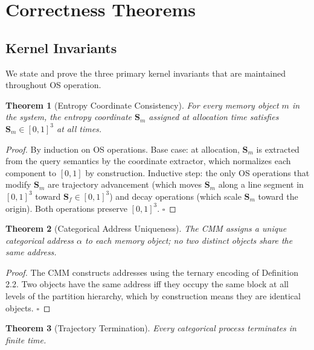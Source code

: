 \documentclass[12pt,twocolumn]{article}
\newtheorem{theorem}{Theorem}[section]
\begin{document}
\section{Correctness Theorems}
\label{sec:correctness}

\subsection{Kernel Invariants}

We state and prove the three primary kernel invariants that are maintained throughout OS operation.

\begin{theorem}[Entropy Coordinate Consistency]
\label{thm:coord_consistency}
For every memory object $m$ in the system, the entropy coordinate $\mathbf{S}_m$ assigned at allocation time satisfies $\mathbf{S}_m \in [0,1]^3$ at all times.
\end{theorem}

\begin{proof}
By induction on OS operations. Base case: at allocation, $\mathbf{S}_m$ is extracted from the query semantics by the coordinate extractor, which normalizes each component to $[0,1]$ by construction. Inductive step: the only OS operations that modify $\mathbf{S}_m$ are trajectory advancement (which moves $\mathbf{S}_m$ along a line segment in $[0,1]^3$ toward $\mathbf{S}_f \in [0,1]^3$) and decay operations (which scale $\mathbf{S}_m$ toward the origin). Both operations preserve $[0,1]^3$. $\square$
\end{proof}

\begin{theorem}[Categorical Address Uniqueness]
\label{thm:addr_unique}
The CMM assigns a unique categorical address $\alpha$ to each memory object; no two distinct objects share the same address.
\end{theorem}

\begin{proof}
The CMM constructs addresses using the ternary encoding of Definition 2.2. Two objects have the same address iff they occupy the same block at all levels of the partition hierarchy, which by construction means they are identical objects. $\square$
\end{proof}

\begin{theorem}[Trajectory Termination]
\label{thm:termination}
Every categorical process terminates in finite time.
\end{theorem}
\end{document}
